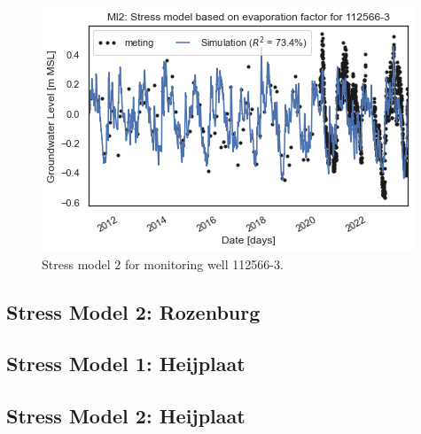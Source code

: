 \begin{figure}[htbp]
\begin{minipage}{0.32\textwidth}
        \includegraphics[width=\linewidth]{figures/results/ml2 112566-3.png}
        \caption{Stress model 2 for monitoring well 112566-3.}
        \label{fig:112565-3}
    \end{minipage}
\end{figure}

\subsection{Stress Model 2: Rozenburg}



\subsection{Stress Model 1: Heijplaat}


\subsection{Stress Model 2: Heijplaat}
